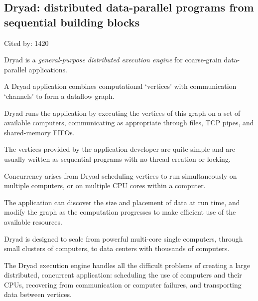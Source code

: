 \documentclass[a4paper,11pt]{article}
\begin{document}
\subsection*{Dryad: distributed data-parallel programs from sequential building blocks}
{\color{cyan} {\color{magenta} Cited by: 1420}

{\color{black} Dryad\cite{dryad}} is a 
{\color{red} \em general-purpose distributed execution engine}
for coarse-grain data-parallel applications. 

A Dryad application combines 
computational `vertices' with 
communication `channels' 
to form a dataflow graph. 

Dryad 
runs the application by 
executing the vertices of this graph on a set of available computers, 
communicating as appropriate through files, TCP pipes, and shared-memory FIFOs.

The vertices provided by the application developer are 
quite simple and are usually written as 
sequential programs with no thread creation or locking. 

Concurrency 
arises from Dryad scheduling vertices to run simultaneously 
on multiple computers, or on multiple CPU cores within a computer.

The application can 
discover the size and placement of data at run time, and 
modify the graph as the computation progresses to make efficient use of the available resources.

Dryad is designed to 
scale 
from powerful multi-core single computers, 
through small clusters of computers, 
to data centers with thousands of computers. 

The Dryad execution engine 
handles all the difficult problems of 
creating a large distributed, concurrent application: 
scheduling the use of computers and their CPUs, 
recovering from communication or computer failures, and 
transporting data between vertices.

}
\end{document}
